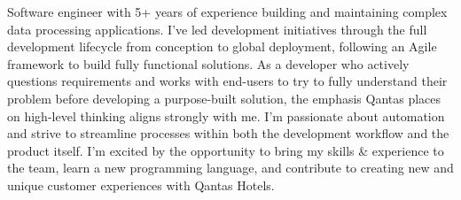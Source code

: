 \begin{justify}
Software engineer with 5+ years of experience building and maintaining complex data processing applications. I’ve led development initiatives through the full development lifecycle from conception to global deployment, following an Agile framework to build fully functional solutions. As a developer who actively questions requirements and works with end-users to try to fully understand their problem before developing a purpose-built solution, the emphasis Qantas places on high-level thinking aligns strongly with me. I'm passionate about automation and strive to streamline processes within both the development workflow and the product itself. I'm excited by the opportunity to bring my skills \& experience to the team, learn a new programming language, and contribute to creating new and unique customer experiences with Qantas Hotels.
\end{justify}